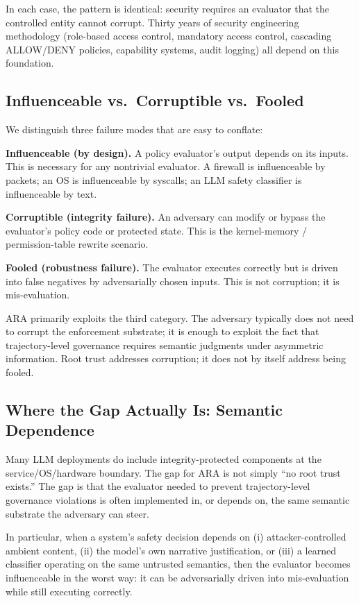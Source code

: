 \documentclass[11pt]{article}
\theoremstyle{definition}
\theoremstyle{plain}
\theoremstyle{remark}
\begin{document}
In each case, the pattern is identical: security requires an evaluator that the controlled entity cannot corrupt. Thirty years of security engineering methodology (role-based access control, mandatory access control, cascading ALLOW/DENY policies, capability systems, audit logging) all depend on this foundation.

\subsection{Influenceable vs.\ Corruptible vs.\ Fooled}

We distinguish three failure modes that are easy to conflate:

\textbf{Influenceable (by design).} A policy evaluator's output depends on its inputs. This is necessary for any nontrivial evaluator. A firewall is influenceable by packets; an OS is influenceable by syscalls; an LLM safety classifier is influenceable by text.

\textbf{Corruptible (integrity failure).} An adversary can modify or bypass the evaluator's policy code or protected state. This is the kernel-memory / permission-table rewrite scenario.

\textbf{Fooled (robustness failure).} The evaluator executes correctly but is driven into false negatives by adversarially chosen inputs. This is not corruption; it is mis-evaluation.

ARA primarily exploits the third category. The adversary typically does not need to corrupt the enforcement substrate; it is enough to exploit the fact that trajectory-level governance requires semantic judgments under asymmetric information. Root trust addresses corruption; it does not by itself address being fooled.

\subsection{Where the Gap Actually Is: Semantic Dependence}

Many LLM deployments do include integrity-protected components at the service/OS/hardware boundary. The gap for ARA is not simply ``no root trust exists.'' The gap is that the evaluator needed to prevent trajectory-level governance violations is often implemented in, or depends on, the same semantic substrate the adversary can steer.

In particular, when a system's safety decision depends on (i) attacker-controlled ambient content, (ii) the model's own narrative justification, or (iii) a learned classifier operating on the same untrusted semantics, then the evaluator becomes influenceable in the worst way: it can be adversarially driven into mis-evaluation while still executing correctly.
\end{document}
